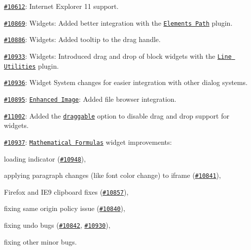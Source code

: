 {\ttfamily 
\begin{DoxyItemize}
\item \href{http://dev.ckeditor.com/ticket/10612}{\tt \#10612}\+: Internet Explorer 11 support.
\item \href{http://dev.ckeditor.com/ticket/10869}{\tt \#10869}\+: Widgets\+: Added better integration with the \href{http://ckeditor.com/addon/elementspath}{\tt Elements Path} plugin.
\item \href{http://dev.ckeditor.com/ticket/10886}{\tt \#10886}\+: Widgets\+: Added tooltip to the drag handle.
\item \href{http://dev.ckeditor.com/ticket/10933}{\tt \#10933}\+: Widgets\+: Introduced drag and drop of block widgets with the \href{http://ckeditor.com/addon/lineutils}{\tt Line Utilities} plugin.
\item \href{http://dev.ckeditor.com/ticket/10936}{\tt \#10936}\+: Widget System changes for easier integration with other dialog systems.
\item \href{http://dev.ckeditor.com/ticket/10895}{\tt \#10895}\+: \href{http://ckeditor.com/addon/image2}{\tt Enhanced Image}\+: Added file browser integration.
\item \href{http://dev.ckeditor.com/ticket/11002}{\tt \#11002}\+: Added the \href{http://docs.ckeditor.com/#!/api/CKEDITOR.plugins.widget.definition-property-draggable}{\tt {\ttfamily draggable}} option to disable drag and drop support for widgets.
\item \href{http://dev.ckeditor.com/ticket/10937}{\tt \#10937}\+: \href{http://ckeditor.com/addon/mathjax}{\tt Mathematical Formulas} widget improvements\+:
\begin{DoxyItemize}
\item loading indicator (\href{http://dev.ckeditor.com/ticket/10948}{\tt \#10948}),
\item applying paragraph changes (like font color change) to iframe (\href{http://dev.ckeditor.com/ticket/10841}{\tt \#10841}),
\item Firefox and I\+E9 clipboard fixes (\href{http://dev.ckeditor.com/ticket/10857}{\tt \#10857}),
\item fixing same origin policy issue (\href{http://dev.ckeditor.com/ticket/10840}{\tt \#10840}),
\item fixing undo bugs (\href{http://dev.ckeditor.com/ticket/10842}{\tt \#10842}, \href{http://dev.ckeditor.com/ticket/10930}{\tt \#10930}),
\item fixing other minor bugs.
\end{DoxyItemize}

\end{DoxyItemize}}
